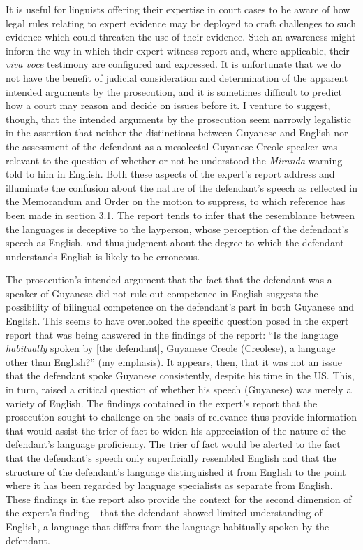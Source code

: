 \documentclass[output=paper,colorlinks,citecolor=brown]{langscibook}
\begin{document}
It is useful for linguists offering their expertise in court cases to be aware of how legal rules relating to expert evidence may be deployed to craft challenges to such evidence which could threaten the use of their evidence. Such an awareness might inform the way in which their expert witness report and, where applicable, their \textit{viva voce} testimony are configured and expressed.  It is unfortunate that we do not have the benefit of judicial consideration and determination of the apparent intended arguments by the prosecution, and it is sometimes difficult to predict how a court may reason and decide on issues before it. I venture to suggest, though, that the intended arguments by the prosecution seem narrowly legalistic in the assertion that neither the distinctions between Guyanese and English nor the assessment of the defendant as a mesolectal Guyanese Creole speaker was relevant to the question of whether or not he understood the \emph{Miranda} warning told to him in English. Both these aspects of the expert’s report address and illuminate the confusion about the nature of the defendant’s speech as reflected in the Memorandum and Order on the motion to suppress, to which reference has been made in section 3.1. The report tends to infer that the resemblance between the languages is deceptive to the layperson, whose perception of the defendant’s speech as English, and thus judgment about the degree to which the defendant understands English is likely to be erroneous.

The prosecution’s intended argument that the fact that the defendant was a speaker of Guyanese did not rule out competence in English suggests the possibility of bilingual competence on the defendant’s part in both Guyanese and English. This seems to have overlooked the specific question posed in the expert report that was being answered in the findings of the report: “Is the language \textit{habitually} spoken by [the defendant], Guyanese Creole (Creolese), a language other than English?” (my emphasis). It appears, then, that it was not an issue that the defendant spoke Guyanese consistently, despite his time in the US. This, in turn, raised a critical question of whether his speech (Guyanese) was merely a variety of English. The findings contained in the expert’s report that the prosecution sought to challenge on the basis of relevance thus provide information that would assist the trier of fact to widen his appreciation of the nature of the defendant’s language proficiency. The trier of fact would be alerted to the fact that the defendant’s speech only superficially resembled English and that the structure of the defendant’s language distinguished it from English to the point where it has been regarded by language specialists as separate from English.  These findings in the report also provide the context for the second dimension of the expert’s finding -- that the defendant showed limited understanding of English, a language that differs from the language habitually spoken by the defendant. 
\end{document}
